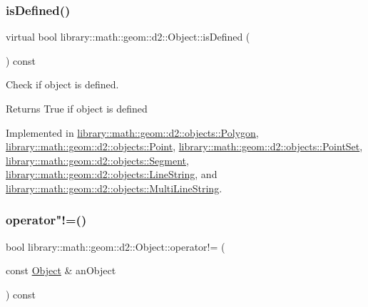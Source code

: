 \subsubsection{\texorpdfstring{is\+Defined()}{isDefined()}}
{\footnotesize\ttfamily virtual bool library\+::math\+::geom\+::d2\+::\+Object\+::is\+Defined (\begin{DoxyParamCaption}{ }\end{DoxyParamCaption}) const\hspace{0.3cm}{\ttfamily [pure virtual]}}



Check if object is defined. 

\begin{DoxyReturn}{Returns}
True if object is defined 
\end{DoxyReturn}


Implemented in \hyperlink{classlibrary_1_1math_1_1geom_1_1d2_1_1objects_1_1_polygon_a83e0962f91f0732048e156ad634faaea}{library\+::math\+::geom\+::d2\+::objects\+::\+Polygon}, \hyperlink{classlibrary_1_1math_1_1geom_1_1d2_1_1objects_1_1_point_ac90251968d8eb11df82e28f6cf095e5c}{library\+::math\+::geom\+::d2\+::objects\+::\+Point}, \hyperlink{classlibrary_1_1math_1_1geom_1_1d2_1_1objects_1_1_point_set_a031a6b5688c65bce8f37af452c0f0959}{library\+::math\+::geom\+::d2\+::objects\+::\+Point\+Set}, \hyperlink{classlibrary_1_1math_1_1geom_1_1d2_1_1objects_1_1_segment_a2c366d74328cdce4a7e83a761a84dbc7}{library\+::math\+::geom\+::d2\+::objects\+::\+Segment}, \hyperlink{classlibrary_1_1math_1_1geom_1_1d2_1_1objects_1_1_line_string_a2ef4a1e387ed463286fac7c93fd7b022}{library\+::math\+::geom\+::d2\+::objects\+::\+Line\+String}, and \hyperlink{classlibrary_1_1math_1_1geom_1_1d2_1_1objects_1_1_multi_line_string_a77de687b2c287226984e2614dafe744a}{library\+::math\+::geom\+::d2\+::objects\+::\+Multi\+Line\+String}.

\mbox{\label{classlibrary_1_1math_1_1geom_1_1d2_1_1_object_a538fa27124314cddf9705cf35a3efc08}} 
\subsubsection{\texorpdfstring{operator"!=()}{operator!=()}}
{\footnotesize\ttfamily bool library\+::math\+::geom\+::d2\+::\+Object\+::operator!= (\begin{DoxyParamCaption}\item[{const \hyperlink{classlibrary_1_1math_1_1geom_1_1d2_1_1_object}{Object} \&}]{an\+Object }\end{DoxyParamCaption}) const}



